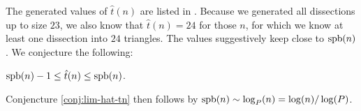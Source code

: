 The generated values of $\hat t(n)$ are listed in . Because we generated all dissections up to size $23$, we also know that $\hat t(n) = 24$ for those $n$, for which we know at least one dissection into $24$ triangles. The values suggestively keep close to $\mathop{\mathrm{spb}}(n)$. We conjecture the following:

\begin{conj} $\mathop{\mathrm{spb}}(n)-1 \leq \hat t(n) \leq \mathop{\mathrm{spb}}(n)$.
\end{conj}%

Conjencture \ref{conj:lim-hat-tn} then follows by $\mathop{\mathrm{spb}}(n) \sim \log_P(n) = \log(n)/\log(P)$.




